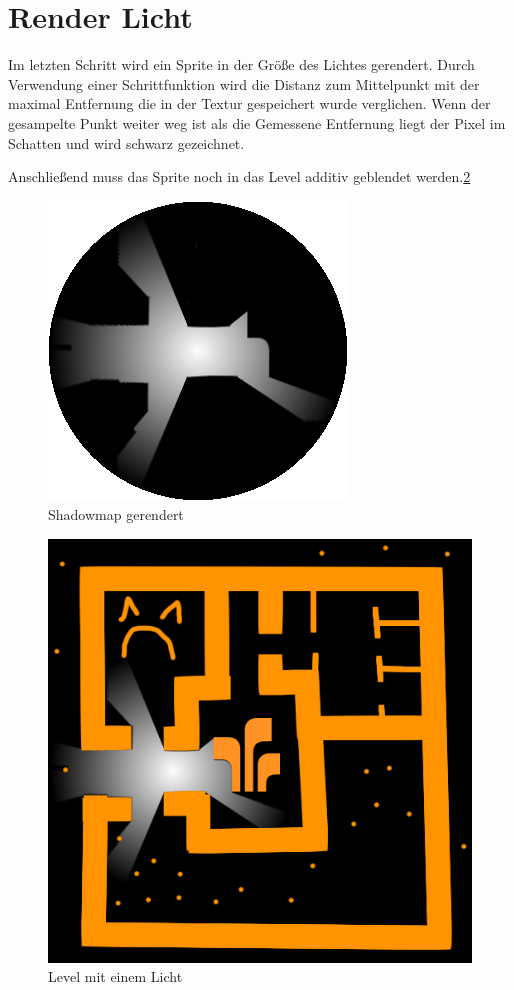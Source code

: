 \section{Render Licht}
Im letzten Schritt wird ein Sprite in der Größe des Lichtes gerendert. Durch Verwendung einer Schrittfunktion wird die Distanz zum Mittelpunkt mit der maximal Entfernung die in der Textur gespeichert wurde verglichen. Wenn der gesampelte Punkt weiter weg ist als die Gemessene Entfernung liegt der Pixel im Schatten und wird schwarz gezeichnet.

Anschließend muss das Sprite noch in das Level additiv geblendet werden.\ref{level_licht_1}
\begin{figure}[h]
	\centering
	\includegraphics{images/shadow_shadow_2.png}
	\caption{Shadowmap gerendert}
	\label{shadows_1}
\end{figure}
\begin{figure}[h]
	\centering
	\includegraphics[scale=0.75]{images/final.png}
	\caption{Level mit einem Licht}
	\label{level_licht_1}
\end{figure}